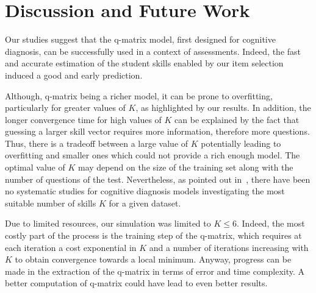 \documentclass{sig-alternate}
\begin{document}
\section{Discussion and Future Work}

Our studies suggest that the q-matrix model, first designed for cognitive diagnosis, can be successfully used in a context of assessments. Indeed, the fast and accurate estimation of the student skills enabled by our item selection  induced a good and early prediction. %

Although, q-matrix being a richer model, it can be prone to overfitting, particularly for greater values of $K$, as highlighted by our results. In addition, the longer convergence time for high values of $K$ can be explained by the fact that guessing a larger skill vector requires more information, therefore more questions. Thus, there is a tradeoff between a large value of $K$ potentially leading to overfitting and smaller ones which could not provide a rich enough model. The optimal value of $K$ may depend on the size of the training set along with the number of questions of the test. Nevertheless, as pointed out in~\cite{Huebner2010}, there have been no systematic studies for cognitive diagnosis models investigating the most suitable number of skills $K$ for a given dataset.



Due to limited resources, our simulation was limited to $K \leqslant 6$. Indeed, the most costly part of the process is the training step of the q-matrix, which requires at each iteration a cost exponential in $K$ and a number of iterations increasing with $K$ to obtain convergence towards a local minimum. Anyway, progress can be made in the extraction of the q-matrix in terms of error and time complexity. A better computation of q-matrix could have lead to even better results.


\end{document}
